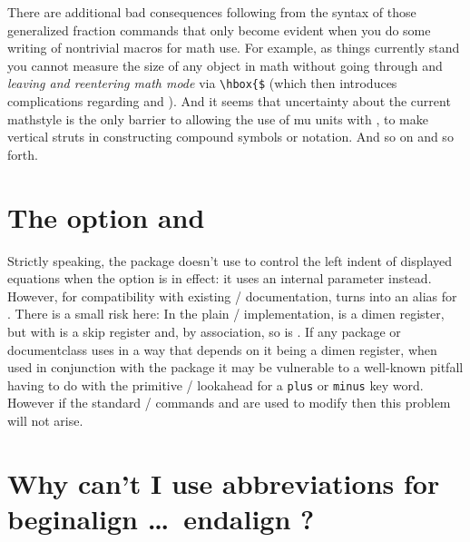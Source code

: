 \documentclass{amsdtx}
\providecommand{\begend}[1]{%
  {\ntt \symbol{92}begin\symbol{123}#1\symbol{125}}
    \ldots\ {\ntt\symbol{92}end\symbol{123}#1\symbol{125}}%
}
\begin{document}
There are additional bad consequences following from the syntax of those
generalized fraction commands that only become evident when you do some
writing of nontrivial macros for math use. For example, as things
currently stand you cannot measure the size of any object in math
without going through  and \emph{leaving and reentering
math mode} via \verb'\hbox{$' (which then introduces complications
regarding  and ). And it seems that
uncertainty about the current mathstyle is the only barrier to allowing
the use of mu units with , to make vertical struts in
constructing compound symbols or notation. And so on and so forth.

\section{The  option and }

Strictly speaking, the  package doesn't use 
to control the left indent of displayed equations when the 
option is in effect: it uses an internal parameter 
instead. However, for compatibility with existing \latex/ documentation,
 turns  into an alias for .
There is a small risk here: In the plain \latex/ implementation,
 is a dimen register, but with 
 is a skip register and, by association, so is
. If any package or documentclass uses  in
a way that depends on it being a dimen register, when used in
conjunction with the  package it may be vulnerable to a
well-known pitfall having to do with the primitive \tex/ lookahead for a
\texttt{plus} or \texttt{minus} key word. However if the standard
\latex/ commands  and  are used to modify
 then this problem will not arise.

\section{Why can't I use abbreviations for \protect\begend{align}?}
\end{document}
